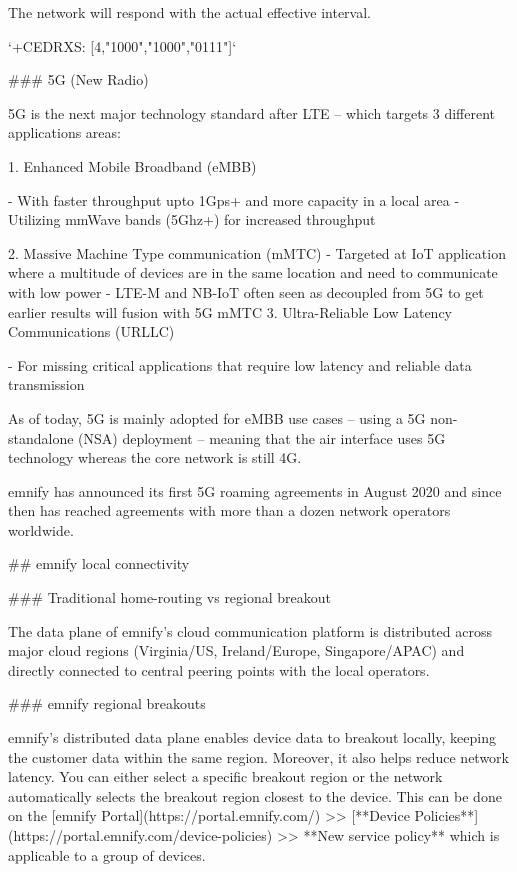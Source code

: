 \documentclass[11pt, oneside]{article}   	%
\newcommand{\addspace}{\vspace{2mm}}
\begin{document}
\begin{markdown}
The network will respond with the actual effective interval.
    
`+CEDRXS: [4,"1000","1000","0111"]`    

### 5G (New Radio)

5G is the next major technology standard after LTE -- which targets 3 different applications areas:
\end{markdown}
\addspace
\begin{markdown}
1. Enhanced Mobile Broadband (eMBB)
\end{markdown}
\addspace
\begin{markdown}
  - With faster throughput upto 1Gps+ and more capacity in a local area
  - Utilizing mmWave bands (5Ghz+) for increased throughput
\end{markdown}
\addspace
\begin{markdown}
2. Massive Machine Type communication (mMTC)  
  - Targeted at IoT application where a multitude of devices are in the same location and need to communicate with low power
  - LTE-M and NB-IoT often seen as decoupled from 5G to get earlier results will fusion with 5G mMTC  
3. Ultra-Reliable Low Latency Communications (URLLC)
\end{markdown}
\addspace
\begin{markdown}
  - For missing critical applications that require low latency and reliable data transmission
\end{markdown}
\addspace
\begin{markdown}
As of today, 5G is mainly adopted for eMBB use cases -- using a 5G non-standalone (NSA) deployment -- meaning that the air interface uses 5G technology whereas the core network is still 4G.

emnify has announced its first 5G roaming agreements in August 2020 and since then has reached agreements with more than a dozen network operators worldwide.

## emnify local connectivity

### Traditional home-routing vs regional breakout

The data plane of emnify's cloud communication platform is distributed across major cloud regions (Virginia/US, Ireland/Europe, Singapore/APAC) and directly connected to central peering points with the local operators.

### emnify regional breakouts

emnify's distributed data plane enables device data to breakout locally, keeping the customer data within the same region.
Moreover, it also helps reduce network latency.
You can either select a specific breakout region or the network automatically selects the breakout region closest to the device.
This can be done on the [emnify Portal](https://portal.emnify.com/) >> [**Device Policies**](https://portal.emnify.com/device-policies) >> **New service policy** which is applicable to a group of devices.

\end{markdown}
\end{document}
